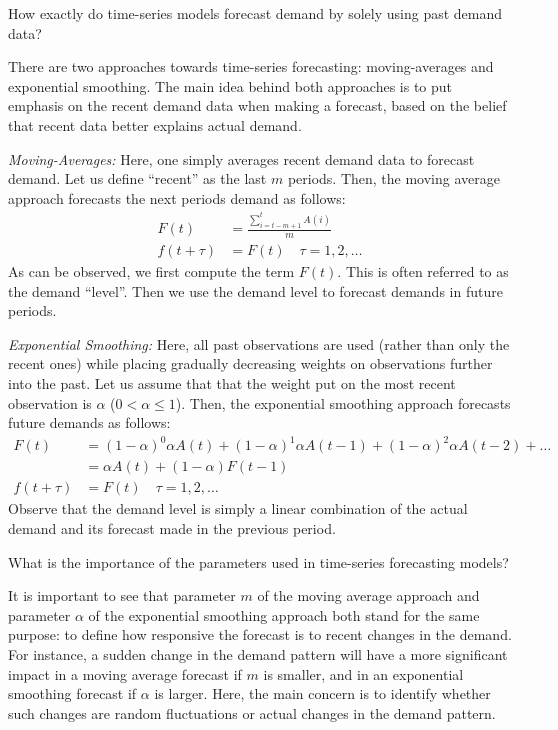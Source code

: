 \begin{question}
How exactly do time-series models forecast demand by solely using past demand data?

  \begin{solution}
There are two approaches towards time-series forecasting: moving-averages and exponential smoothing. The main idea behind both approaches is to put emphasis on the recent demand data when making a forecast, based on the belief that recent data better explains actual demand.

\textit{Moving-Averages:} 
Here, one simply averages recent demand data to forecast demand. Let us define ``recent'' as the last $m$ periods. Then, the moving average approach forecasts the next periods demand as follows:
\begin{align*}
F(t) & = \frac{\sum_{i=t-m+1}^t A(i)}{m} \\
f(t+\tau) & = F(t) \quad \tau = 1,2,\ldots
\end{align*}
As can be observed, we first compute the term $F(t)$. This is often referred to as the demand ``level''. Then we use the demand level to forecast demands in future periods. 

\textit{Exponential Smoothing:} 
Here, all past observations are used (rather than only the recent ones) while placing gradually decreasing weights on observations further into the past. Let us assume that that the weight put on the most recent observation is $\alpha$ ($0<\alpha\leq 1$). Then, the exponential smoothing approach forecasts future demands as follows:
\begin{align*}
F(t) & = (1-\alpha)^0 \alpha A(t) + (1-\alpha)^1 \alpha A(t-1) + (1-\alpha)^2 \alpha A(t-2) + \ldots \\
& = \alpha A(t) + (1-\alpha) F(t-1) \\
f(t+\tau) & = F(t) \quad \tau = 1,2,\ldots
\end{align*}
Observe that the demand level is simply a linear combination of the actual demand and its forecast made in the previous period. 

  \end{solution}
\end{question}

\begin{question}
What is the importance of the parameters used in time-series forecasting models?

  \begin{solution}
It is important to see that parameter $m$ of the moving average approach and parameter $\alpha$ of the exponential smoothing approach both stand for the same purpose: to define how responsive the forecast is to recent changes in the demand. For instance, a sudden change in the demand pattern will have a more significant impact in a moving average forecast if $m$ is smaller, and in an exponential smoothing forecast if $\alpha$ is larger. Here, the main concern is to identify whether such changes are random fluctuations or actual changes in the demand pattern. 
    
      \end{solution}
\end{question}


